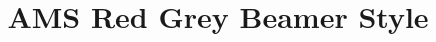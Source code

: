 \newcommand{\swatch}[1]{\fcolorbox{rggreyline}{#1}{\rule{0pt}{1.3ex}\rule{2.2ex}{0pt}}}
\newcommand{\swgroup}[1]{\multicolumn{2}{@{}l}{\textcolor{rgreddeep}{\textbf{#1}}}}
\title[AMS Red Grey Beamer Style]
{AMS Red Grey Beamer Style}
